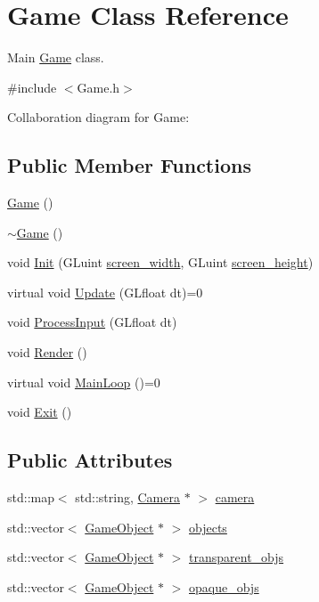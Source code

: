 \hypertarget{class_game}{}\section{Game Class Reference}
\label{class_game}


Main \mbox{\hyperlink{class_game}{Game}} class.  




{\ttfamily \#include $<$Game.\+h$>$}



Collaboration diagram for Game\+:
\subsection*{Public Member Functions}
\begin{DoxyCompactItemize}
\item 
\mbox{\hyperlink{class_game_ad59df6562a58a614fda24622d3715b65}{Game}} ()
\item 
\mbox{\hyperlink{class_game_ae3d112ca6e0e55150d2fdbc704474530}{$\sim$\+Game}} ()
\item 
void \mbox{\hyperlink{class_game_a8f6f29e6c7f2e33801a942ebd227cf37}{Init}} (G\+Luint \mbox{\hyperlink{class_game_ac05df6adfb712932bac2afea1fb01dc3}{screen\+\_\+width}}, G\+Luint \mbox{\hyperlink{class_game_ab52e2343e6335e426a6395c44f4dab71}{screen\+\_\+height}})
\item 
virtual void \mbox{\hyperlink{class_game_a4b30da80605844abc5fb07e732b85b39}{Update}} (G\+Lfloat dt)=0
\item 
void \mbox{\hyperlink{class_game_a25e7b07142487f0f6772809f3732a0ec}{Process\+Input}} (G\+Lfloat dt)
\item 
void \mbox{\hyperlink{class_game_a0897730fc9fed789f6c0f11d21a0c14a}{Render}} ()
\item 
virtual void \mbox{\hyperlink{class_game_a385a99545d3ddbce7893807939da63da}{Main\+Loop}} ()=0
\item 
void \mbox{\hyperlink{class_game_ad06e374518f2c8fa38279be6712a6ea4}{Exit}} ()
\end{DoxyCompactItemize}
\subsection*{Public Attributes}
\begin{DoxyCompactItemize}
\item 
std\+::map$<$ std\+::string, \mbox{\hyperlink{class_camera}{Camera}} $\ast$ $>$ \mbox{\hyperlink{class_game_af4eb1b9c217dcb0f860ec9b0320f2274}{camera}}
\item 
std\+::vector$<$ \mbox{\hyperlink{class_game_object}{Game\+Object}} $\ast$ $>$ \mbox{\hyperlink{class_game_ac025aa21d226a5beb9ba19bc418af894}{objects}}
\item 
std\+::vector$<$ \mbox{\hyperlink{class_game_object}{Game\+Object}} $\ast$ $>$ \mbox{\hyperlink{class_game_a29149a40296ca49ec4aacdad04716fe4}{transparent\+\_\+objs}}
\item 
std\+::vector$<$ \mbox{\hyperlink{class_game_object}{Game\+Object}} $\ast$ $>$ \mbox{\hyperlink{class_game_affc1bb149ae6c474261ba1bfe133af07}{opaque\+\_\+objs}}
\end{DoxyCompactItemize}
